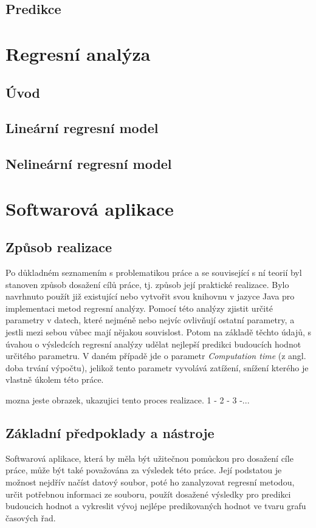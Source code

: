 \documentclass[a4paper,12pt,twoside]{scrreprt}
\begin{document}
\subsection{Predikce}

\section{Regresní analýza}
\subsection{Úvod}
\subsection{Lineární regresní model}
\subsection{Nelineární regresní model}

\newpage
\section{Softwarová aplikace}
\subsection{Způsob realizace}

Po důkladném seznamením s problematikou práce a se související s ní teorií byl stanoven způsob dosažení cílů práce, tj. způsob její praktické realizace. Bylo navrhnuto použít již existující nebo vytvořit svou knihovnu v jazyce Java pro implementaci metod regresní analýzy. Pomocí této analýzy zjistit určité parametry v datech, které nejméně nebo nejvíc ovlivňují ostatní parametry, a jestli mezi sebou vůbec mají nějakou souvislost. Potom na základě těchto údajů, s úvahou o výsledcích regresní analýzy udělat nejlepší predikci budoucích hodnot určitého parametru. V daném případě jde o parametr \textit{Computation time} (z angl. doba trvání výpočtu), jelikož tento parametr vyvolává zatížení, snížení kterého je vlastně úkolem této práce. 

mozna jeste obrazek, ukazujici tento proces realizace. 1 - 2 - 3 -...

\subsection{Základní předpoklady a nástroje}
Softwarová aplikace, která by měla být užitečnou pomůckou pro dosažení cíle práce, může být také považována za výsledek této práce. Její podstatou je možnost nejdřív načíst datový soubor, poté ho zanalyzovat regresní metodou, určit potřebnou informaci ze souboru, použít dosažené výsledky pro predikci budoucich hodnot a vykreslit vývoj nejlépe predikovaných hodnot ve tvaru grafu časových řad. 
\end{document}
